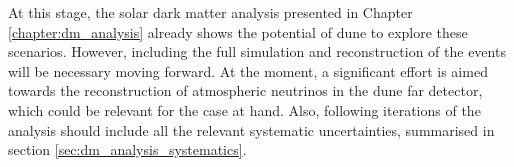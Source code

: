 \begin{comment}
The solar dark matter analysis is covered in Chapter \ref{chapter:dm_analysis}. There I explain how the \gls{dune} far detector can be used to probe dark matter interactions by measuring the neutrino flux coming from dark matter annihilations in the core of the Sun. After introducing the topic of dark matter capture and annihilation in a massive object like the Sun, I describe what kind of neutrino signals one can expect from such events in section \ref{sec:dm_analysis_flux}. Later, I comment on how \gls{dune} could constrain the dark matter parameter space by performing counting experiments. In section \ref{sec:dm_analysis_high_e_nu} I study the selection efficiency for the $\tau^{+}\tau^{-}$ and $b\bar{b}$ channels. I focus on two different kinematic regimes: the high energy neutrinos where \gls{dis} interactions with argon dominate, and the low energy part of the spectrum where neutrinos mainly undergo QEL interactions. This allows me to compute the projected generator-level dark matter cross section sensitivities, showing how \gls{dune} can be complementary to other indirect dark matter searches. Additionally, I explore two specific realisations of the dark matter interactions, namely Kaluza-Klein and leptophilic dark matter.

At this stage, this analysis already shows the potential of \gls{dune} to explore these scenarios. However, including the full simulation and reconstruction of the events will be necessary moving forward. At the moment, a significant effort is aimed towards the reconstruction of atmospheric neutrinos in the \gls{dune} far detector, which could be relevant for the case at hand. Also, following iterations of the analysis should include all the relevant systematic uncertainties. A summary of these is presented in section \ref{sec:dm_analysis_systematics}.
\end{comment}

At this stage, the solar dark matter analysis presented in Chapter \ref{chapter:dm_analysis} already shows the potential of \gls{dune} to explore these scenarios. However, including the full simulation and reconstruction of the events will be necessary moving forward. At the moment, a significant effort is aimed towards the reconstruction of atmospheric neutrinos in the \gls{dune} far detector, which could be relevant for the case at hand. Also, following iterations of the analysis should include all the relevant systematic uncertainties, summarised in section \ref{sec:dm_analysis_systematics}.

